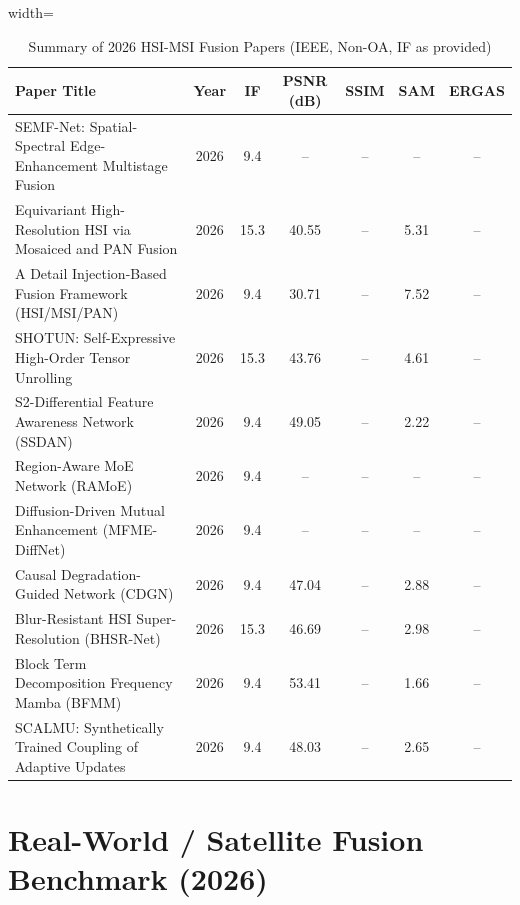 \documentclass[conference]{IEEEtran}
\begin{document}
\begin{table}[htbp]
\caption{Summary of 2026 HSI-MSI Fusion Papers (IEEE, Non-OA, IF as provided)}
\label{tab:summary}
\begin{center}
\begin{adjustbox}{width=\textwidth}
\begin{tabular}{p{5.6cm}c|c|c|c|c|c}
\toprule
\textbf{Paper Title} & \textbf{Year} & \textbf{IF} & \textbf{PSNR (dB)} & \textbf{SSIM} & \textbf{SAM} & \textbf{ERGAS} \\
\midrule
SEMF-Net: Spatial-Spectral Edge-Enhancement Multistage Fusion \cite{semfnet2026} & 2026 & 9.4 & -- & -- & -- & -- \\
Equivariant High-Resolution HSI via Mosaiced and PAN Fusion \cite{wang2026equivariant} & 2026 & 15.3 & 40.55 & -- & 5.31 & -- \\
A Detail Injection-Based Fusion Framework (HSI/MSI/PAN) \cite{fang2026detail} & 2026 & 9.4 & 30.71 & -- & 7.52 & -- \\
SHOTUN: Self-Expressive High-Order Tensor Unrolling \cite{wang2026shotun} & 2026 & 15.3 & 43.76 & -- & 4.61 & -- \\
S2-Differential Feature Awareness Network (SSDAN) \cite{ssdan2026} & 2026 & 9.4 & 49.05 & -- & 2.22 & -- \\
Region-Aware MoE Network (RAMoE) \cite{ramoe2026} & 2026 & 9.4 & -- & -- & -- & -- \\
Diffusion-Driven Mutual Enhancement (MFME-DiffNet) \cite{mfme2026} & 2026 & 9.4 & -- & -- & -- & -- \\
Causal Degradation-Guided Network (CDGN) \cite{liu2026causal} & 2026 & 9.4 & 47.04 & -- & 2.88 & -- \\
Blur-Resistant HSI Super-Resolution (BHSR-Net) \cite{dou2026bhsrnet} & 2026 & 15.3 & 46.69 & -- & 2.98 & -- \\
Block Term Decomposition Frequency Mamba (BFMM) \cite{li2026bfmm} & 2026 & 9.4 & 53.41 & -- & 1.66 & -- \\
SCALMU: Synthetically Trained Coupling of Adaptive Updates \cite{xu2026scalmu} & 2026 & 9.4 & 48.03 & -- & 2.65 & -- \\
\bottomrule
\end{tabular}
\end{adjustbox}
\end{center}
\end{table}

\section{Real-World / Satellite Fusion Benchmark (2026)}
\end{document}
